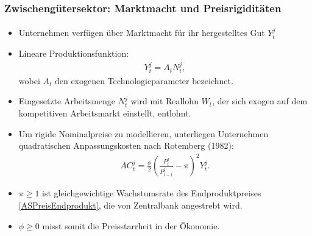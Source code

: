 \documentclass[10pt]{beamer}  %
\begin{document}
\begin{frame}
\frametitle{Zwischeng\"{u}tersektor: Marktmacht und Preisrigidit\"{a}ten}\framesubtitle{}
\begin{itemize}
  \item Unternehmen verf\"{u}gen \"{u}ber Marktmacht f\"{u}r ihr hergestelltes Gut $Y_t^j$
  \item Lineare Produktionsfunktion:
\begin{align}\label{ASProdFktZG}
    Y_t^j = A_t N_t^j,
\end{align}
wobei $A_t$ den exogenen Technologieparameter bezeichnet.
\item Eingesetzte Arbeitsmenge $N_t^j$ wird mit Reallohn $W_t$, der sich exogen auf dem kompetitiven Arbeitsmarkt einstellt, entlohnt.
\item Um rigide Nominalpreise zu modellieren, unterliegen Unternehmen quadratischen Anpassungskosten nach Rotemberg (1982):
\begin{align*}
    AC_t^j = \frac{\phi}{2} \left(\frac{P_t^j}{P_{t-1}^j} - \pi \right)^2 Y_t^j.
\end{align*}
\item $\pi\geq1$ ist gleichgewichtige Wachstumsrate des Endproduktpreises \eqref{ASPreisEndprodukt}, die von Zentralbank angestrebt wird.
\item $\phi\geq0$ misst somit die Preisstarrheit in der \"{O}konomie.
\end{itemize}
\end{frame}
\end{document}
